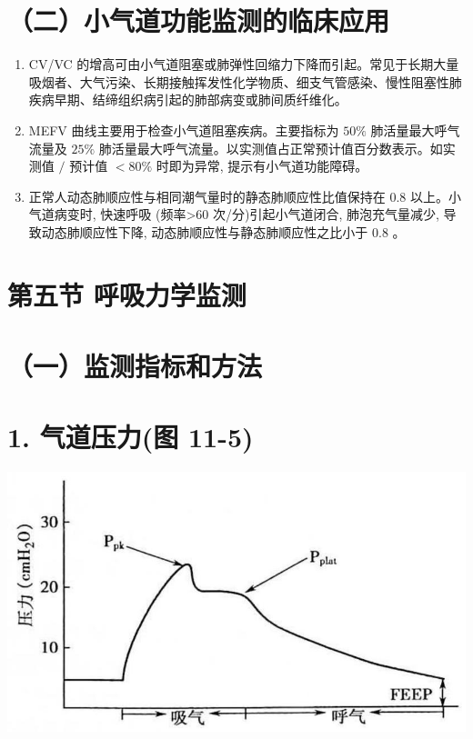 \documentclass[10pt]{article}
\begin{document}
\section*{（二）小气道功能监测的临床应用}
\begin{enumerate}
  \item CV/VC 的增高可由小气道阻塞或肺弹性回缩力下降而引起。常见于长期大量吸烟者、大气污染、长期接触挥发性化学物质、细支气管感染、慢性阻塞性肺疾病早期、结缔组织病引起的肺部病变或肺间质纤维化。

  \item MEFV 曲线主要用于检查小气道阻塞疾病。主要指标为 $50 \%$ 肺活量最大呼气流量及 $25 \%$ 肺活量最大呼气流量。以实测值占正常预计值百分数表示。如实测值 $/$ 预计值 $<80 \%$ 时即为异常, 提示有小气道功能障碍。

  \item 正常人动态肺顺应性与相同潮气量时的静态肺顺应性比值保持在 0.8 以上。小气道病变时, 快速呼吸 (频率>60 次/分)引起小气道闭合, 肺泡充气量减少, 导致动态肺顺应性下降, 动态肺顺应性与静态肺顺应性之比小于 0.8 。

\end{enumerate}

\section*{第五节 呼吸力学监测}
\section*{（一）监测指标和方法}
\section*{1. 气道压力(图 11-5)}
\begin{center}
\includegraphics[max width=\textwidth]{2024_07_09_002a177993bd97d1d6d7g-123}
\end{center}
\end{document}
